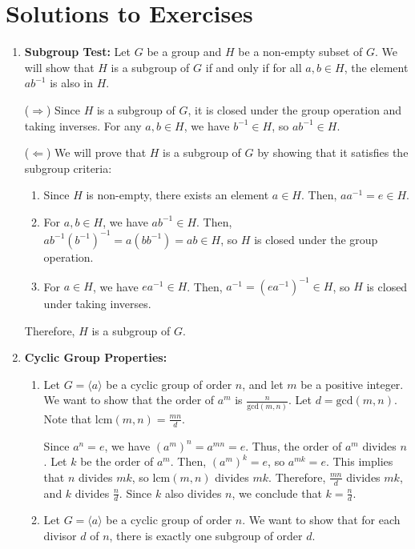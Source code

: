 \section{Solutions to Exercises}

\begin{enumerate}
  \item \textbf{Subgroup Test:} Let $G$ be a group and $H$ be a non-empty subset of $G$. We will show that $H$ is a subgroup of $G$ if and only if for all $a, b \in H$, the element $ab^{-1}$ is also in $H$.
  
  ($\Rightarrow$) Since $H$ is a subgroup of $G$, it is closed under the group operation and taking inverses. For any $a, b \in H$, we have $b^{-1} \in H$, so $ab^{-1} \in H$.

  ($\Leftarrow$) We will prove that $H$ is a subgroup of $G$ by showing that it satisfies the subgroup criteria:
  \begin{enumerate}
    \item Since $H$ is non-empty, there exists an element $a \in H$. Then, $aa^{-1} = e \in H$.
    \item For $a, b \in H$, we have $ab^{-1} \in H$. Then, $ab^{-1}(b^{-1})^{-1} = a(bb^{-1}) = ab \in H$, so $H$ is closed under the group operation.
    \item For $a \in H$, we have $ea^{-1} \in H$. Then, $a^{-1} = (ea^{-1})^{-1} \in H$, so $H$ is closed under taking inverses.
  \end{enumerate}
  Therefore, $H$ is a subgroup of $G$.

  \item \textbf{Cyclic Group Properties:}
  \begin{enumerate}
    \item Let $G = \langle a \rangle$ be a cyclic group of order $n$, and let $m$ be a positive integer. We want to show that the order of $a^m$ is $\frac{n}{\text{gcd}(m, n)}$. Let $d = \text{gcd}(m, n)$. Note that $\text{lcm}(m, n) = \frac{mn}{d}$.

    Since $a^n = e$, we have $(a^m)^n = a^{mn} = e$. Thus, the order of $a^m$ divides $n$. Let $k$ be the order of $a^m$. Then, $(a^m)^k = e$, so $a^{mk} = e$. This implies that $n$ divides $mk$, so $\text{lcm}(m, n)$ divides $mk$. Therefore, $\frac{mn}{d}$ divides $mk$, and $k$ divides $\frac{n}{d}$. Since $k$ also divides $n$, we conclude that $k = \frac{n}{d}$.

    \item Let $G = \langle a \rangle$ be a cyclic group of order $n$. We want to show that for each divisor $d$ of $n$, there is exactly one subgroup of order $d$.


\end{enumerate}
\end{enumerate}
